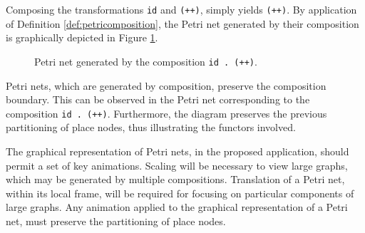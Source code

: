 \documentclass[../Dissertation.tex]{subfiles}
\begin{document}
Composing the transformations \lstinline{id} and \lstinline{(++)}, simply yields \lstinline{(++)}. By application of Definition \ref{def:petricomposition}, the Petri net generated by their composition is graphically depicted in Figure \ref{fig:petriidconcat}.
\begin{figure}[H]
  \begin{center}
  \end{center}
  \caption{Petri net generated by the composition \lstinline{id . (++)}.}
  \label{fig:petriidconcat}
\end{figure}
Petri nets, which are generated by composition, preserve the composition boundary. This can be observed in the Petri net corresponding to the composition \lstinline{id . (++)}. Furthermore, the diagram preserves the previous partitioning of place nodes, thus illustrating the functors involved.
\par
The graphical representation of Petri nets, in the proposed application, should permit a set of key animations. Scaling will be necessary to view large graphs, which may be generated by multiple compositions. Translation of a Petri net, within its local frame, will be required for focusing on particular components of large graphs. Any animation applied to the graphical representation of a Petri net, must preserve the partitioning of place nodes.
\end{document}
